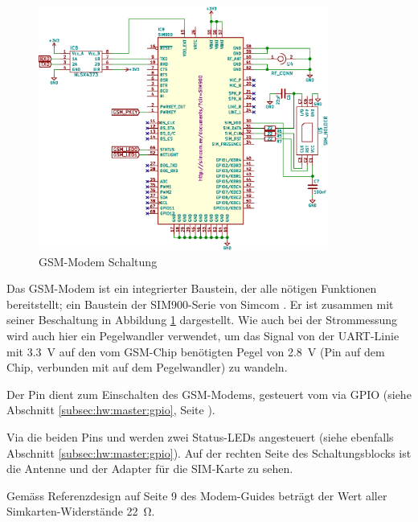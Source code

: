 \begin{figure}[h!t]
    \centering
    \includegraphics[width=0.85\textwidth]{images/superv-sch/supervisor--sch--gsm.eps}
    \caption[\Master: Schema GSM-Modem]{GSM-Modem Schaltung}
    \label{fig:sch:master:gsm}
\end{figure}

Das GSM-Modem  ist ein  integrierter Baustein,  der alle  n\"otigen Funktionen
bereitstellt; ein Baustein der SIM900-Serie von Simcom \cite{datasheet:modem}.
Er ist  zusammen mit seiner Beschaltung  in Abbildung \ref{fig:sch:master:gsm}
dargestellt. Wie auch  bei der  Strommessung wird  auch hier  ein Pegelwandler
verwendet, um  das Signal von der  UART-Linie mit \SI{3.3}{\volt} auf  den vom
GSM-Chip ben\"otigten  Pegel von \SI{2.8}{\volt} (Pin   auf dem
Chip, verbunden mit  auf dem Pegelwandler) zu wandeln.

Der  Pin   dient  zum  Einschalten  des GSM-Modems,  gesteuert
vom  \Raspi  via  GPIO  (siehe  Abschnitt  \ref{subsec:hw:master:gpio},  Seite
\pageref{subsec:hw:master:gpio}).

Via die beiden Pins   und  werden zwei Status-LEDs
angesteuert (siehe  ebenfalls Abschnitt  \ref{subsec:hw:master:gpio}). Auf der
rechten Seite des  Schaltungsblocks ist die Antenne und der  Adapter f\"ur die
SIM-Karte zu sehen.

Gem\"ass  Referenzdesign  auf  Seite 9  des  Modem-Guides  \cite{ref:sim900:1}
betr\"agt der Wert aller Simkarten-Widerst\"ande \SI{22}{\ohm}.
